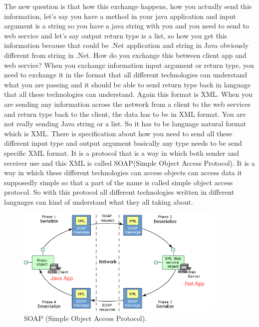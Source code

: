 The new question is that how this exchange happens, how you actually send this information, let’s say you have a method in your java application and input argument is a string so you have a java string with you and you need to send to web service and let’s say output return type is a list, so how you get this information because that could be .Net application and string in Java obviously different from string in .Net. How do you exchange this between client app and web service?  When you exchange information input argument or return type, you need to exchange it in the format that all different technologies can understand what you are passing and it should be able to send return type back in language that all these technologies can understand. Again this format is XML. When you are sending any information across the network from a client to the web services and
return type back to the client, the data has to be in XML format. You are not really sending Java string or a list. So it has to be language natural format which is XML. There is specification about how you need to send all these different input type and output argument basically any type needs to be send specific XML format. It is a protocol that is a way in which both sender and receiver use and this XML is called SOAP(Simple Object Access Protocol). It is a way in which these different technologies can access objects can access data it supposedly simple so that a part of the name is called simple object access protocol. So with this protocol all different technologies written in different languages can kind of understand what they all taking about.

\begin{figure}[!htb]
  \centering
  \includegraphics[width=0.9\textwidth]{Figures/soap.png}
  \caption[SOAP (Simple Object Access Protocol).]{SOAP (Simple Object Access Protocol).}
  \label{fig:wsdl}
\end{figure}

